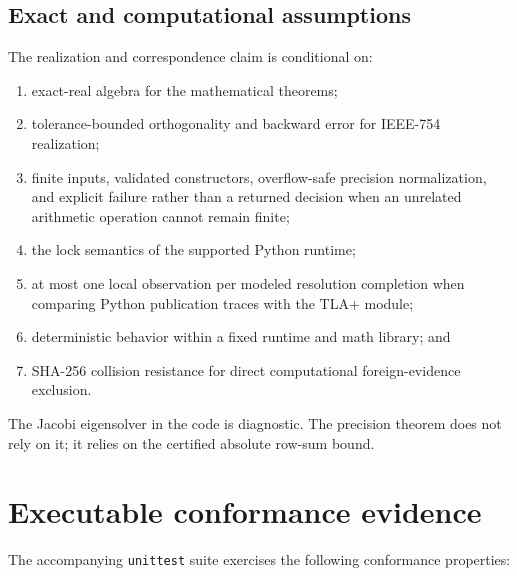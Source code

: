 \documentclass[11pt]{article}
\theoremstyle{definition}
\theoremstyle{plain}
\begin{document}
\subsection{Exact and computational assumptions}

The realization and correspondence claim is conditional on:
\begin{enumerate}[leftmargin=*,itemsep=1pt]
  \item exact-real algebra for the mathematical theorems;
  \item tolerance-bounded orthogonality and backward error for IEEE-754
  realization;
  \item finite inputs, validated constructors, overflow-safe precision
  normalization, and explicit failure rather than a returned decision when an
  unrelated arithmetic operation cannot remain finite;
  \item the lock semantics of the supported Python runtime;
  \item at most one local observation per modeled resolution completion when
  comparing Python publication traces with the TLA+ module;
  \item deterministic behavior within a fixed runtime and math library; and
  \item SHA-256 collision resistance for direct computational foreign-evidence
  exclusion.
\end{enumerate}

The Jacobi eigensolver in the code is diagnostic.  The precision theorem does
not rely on it; it relies on the certified absolute row-sum bound.

\section{Executable conformance evidence}

The accompanying \texttt{unittest} suite exercises the following conformance
properties:
\end{document}

